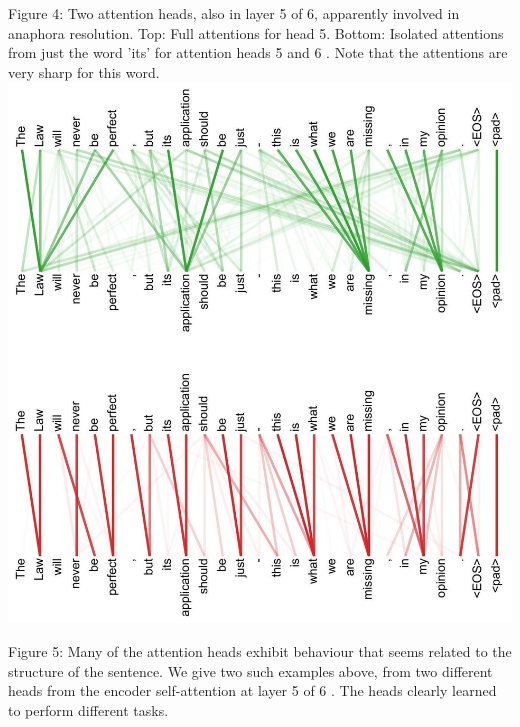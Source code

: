 \documentclass[10pt]{article}
\begin{document}
Figure 4: Two attention heads, also in layer 5 of 6, apparently involved in anaphora resolution. Top: Full attentions for head 5. Bottom: Isolated attentions from just the word 'its' for attention heads 5 and 6 . Note that the attentions are very sharp for this word.\\
\includegraphics[max width=\textwidth, center]{2024_11_26_e9e27627ef2b75478aaag-15}

Figure 5: Many of the attention heads exhibit behaviour that seems related to the structure of the sentence. We give two such examples above, from two different heads from the encoder self-attention at layer 5 of 6 . The heads clearly learned to perform different tasks.
\end{document}
